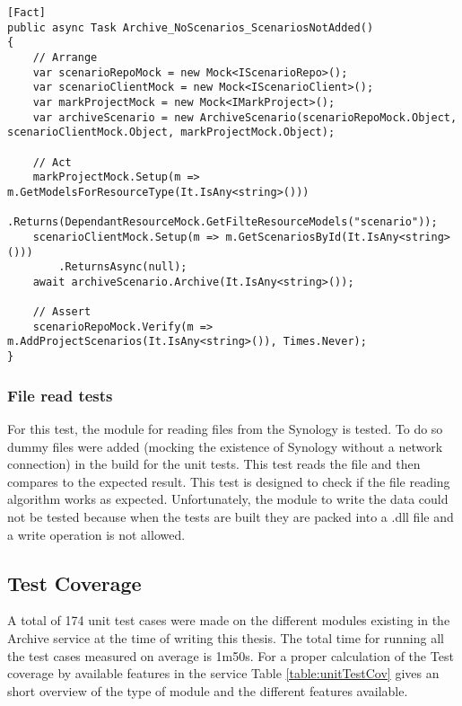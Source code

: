 \begin{lstlisting}[language={[Sharp]C}, caption={No scenarios added if resource empty}, captionpos=b,label={lst:scenarisEmpty}]
[Fact]
public async Task Archive_NoScenarios_ScenariosNotAdded()
{
    // Arrange
    var scenarioRepoMock = new Mock<IScenarioRepo>();
    var scenarioClientMock = new Mock<IScenarioClient>();
    var markProjectMock = new Mock<IMarkProject>();
    var archiveScenario = new ArchiveScenario(scenarioRepoMock.Object, scenarioClientMock.Object, markProjectMock.Object);
    
    // Act
    markProjectMock.Setup(m => m.GetModelsForResourceType(It.IsAny<string>()))
        .Returns(DependantResourceMock.GetFilteResourceModels("scenario"));
    scenarioClientMock.Setup(m => m.GetScenariosById(It.IsAny<string>()))
        .ReturnsAsync(null);
    await archiveScenario.Archive(It.IsAny<string>());                
    
    // Assert
    scenarioRepoMock.Verify(m => m.AddProjectScenarios(It.IsAny<string>()), Times.Never);
}
\end{lstlisting}

\subsubsection{File read tests}
For this test, the module for reading files from the Synology is tested. To do so dummy files were added (mocking the existence of Synology without 
a network connection) in the build for the unit tests. This test reads the file
and then compares to the expected result. This test is designed to check if the file reading algorithm works as expected. Unfortunately, the module to write the data
could not be tested because when the tests are built they are packed into a .dll file and a write operation is not allowed.

\subsection{Test Coverage}
A total of 174 unit test cases were made on the different modules existing in the Archive service at the time of writing this thesis. The total time for running all 
the test cases measured on average is 1m50s. For a proper calculation of the Test coverage by available features in the service Table \ref{table:unitTestCov} gives an short
overview of the type of module and the different features available.

